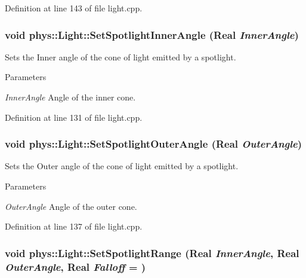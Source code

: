 Definition at line 143 of file light.cpp.

\hypertarget{classphys_1_1Light_a3b812a0181d08f3c30c9a75f13fd6282}{
\subsubsection[{SetSpotlightInnerAngle}]{\setlength{\rightskip}{0pt plus 5cm}void phys::Light::SetSpotlightInnerAngle ({\bf Real} {\em InnerAngle})}}
\label{dc/df1/classphys_1_1Light_a3b812a0181d08f3c30c9a75f13fd6282}


Sets the Inner angle of the cone of light emitted by a spotlight. 


\begin{DoxyParams}{Parameters}
\item[{\em InnerAngle}]Angle of the inner cone. \end{DoxyParams}


Definition at line 131 of file light.cpp.

\hypertarget{classphys_1_1Light_a6cab679dfc15d35e3d3b8b229e602fff}{
\subsubsection[{SetSpotlightOuterAngle}]{\setlength{\rightskip}{0pt plus 5cm}void phys::Light::SetSpotlightOuterAngle ({\bf Real} {\em OuterAngle})}}
\label{dc/df1/classphys_1_1Light_a6cab679dfc15d35e3d3b8b229e602fff}


Sets the Outer angle of the cone of light emitted by a spotlight. 


\begin{DoxyParams}{Parameters}
\item[{\em OuterAngle}]Angle of the outer cone. \end{DoxyParams}


Definition at line 137 of file light.cpp.

\hypertarget{classphys_1_1Light_a25c79247a42b49d04825bbc76977a134}{
\subsubsection[{SetSpotlightRange}]{\setlength{\rightskip}{0pt plus 5cm}void phys::Light::SetSpotlightRange ({\bf Real} {\em InnerAngle}, \/  {\bf Real} {\em OuterAngle}, \/  {\bf Real} {\em Falloff} = {})}}
\label{dc/df1/classphys_1_1Light_a25c79247a42b49d04825bbc76977a134}


